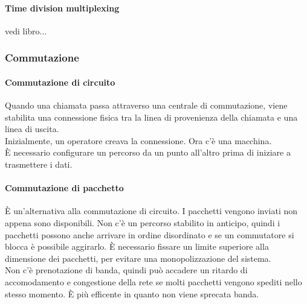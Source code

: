 \documentclass{article}
\begin{document}
			\paragraph{Time division multiplexing}
			vedi libro...
			\subsubsection{Commutazione}
			\paragraph{Commutazione di circuito}
			Quando una chiamata passa attraverso una centrale di commutazione, viene stabilita una connessione fisica tra la linea di provenienza della chiamata e una linea di uscita.\\
			Inizialmente, un operatore creava la connessione. Ora c'è una macchina.\\
			È necessario configurare un percorso da un punto all'altro prima di iniziare a trasmettere i dati. 
			
			\paragraph{Commutazione di pacchetto}
			È un'alternativa alla commutazione di circuito. I pacchetti vengono inviati non appena sono disponibili. Non c'è un percorso stabilito in anticipo, quindi i pacchetti possono anche arrivare in ordine disordinato e se un commutatore si blocca è possibile aggirarlo. È necessario fissare un limite superiore alla dimensione dei pacchetti, per evitare una monopolizzazione del sistema. \\
			Non c'è prenotazione di banda, quindi può accadere un ritardo di accomodamento e congestione della rete se molti pacchetti vengono spediti nello stesso momento.  È più efficente in quanto non viene sprecata banda.\\
\end{document}
